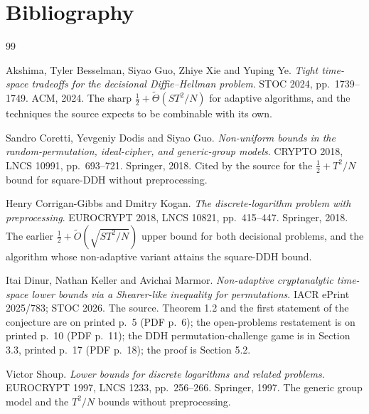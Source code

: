 \documentclass{conjura-conjecture}
\newcommand{\Ot}{\widetilde{O}}
\newcommand{\Th}{\widetilde{\Theta}}
\begin{document}
\section{Bibliography}

\begin{conjurabibliography}{99}

Akshima, Tyler Besselman, Siyao Guo, Zhiye Xie and Yuping Ye.
\emph{Tight time-space tradeoffs for the decisional Diffie--Hellman
problem}.
STOC 2024, pp.\ 1739--1749. ACM, 2024.
The sharp $\tfrac{1}{2} + \Th(ST^{2}/N)$ for adaptive algorithms, and
the techniques the source expects to be combinable with its own.

Sandro Coretti, Yevgeniy Dodis and Siyao Guo.
\emph{Non-uniform bounds in the random-permutation, ideal-cipher, and
generic-group models}.
CRYPTO 2018, LNCS 10991, pp.\ 693--721. Springer, 2018.
Cited by the source for the $\tfrac{1}{2} + T^{2}/N$ bound for
square-DDH without preprocessing.

Henry Corrigan-Gibbs and Dmitry Kogan.
\emph{The discrete-logarithm problem with preprocessing}.
EUROCRYPT 2018, LNCS 10821, pp.\ 415--447. Springer, 2018.
The earlier $\tfrac{1}{2} + \Ot(\sqrt{ST^{2}/N})$ upper bound for both
decisional problems, and the algorithm whose non-adaptive variant
attains the square-DDH bound.

Itai Dinur, Nathan Keller and Avichai Marmor.
\emph{Non-adaptive cryptanalytic time-space lower bounds via a
Shearer-like inequality for permutations}.
IACR ePrint 2025/783; STOC 2026.
The source. Theorem 1.2 and the first statement of the conjecture are
on printed p.\ 5 (PDF p.\ 6); the open-problems restatement is on
printed p.\ 10 (PDF p.\ 11); the DDH permutation-challenge game is in
Section 3.3, printed p.\ 17 (PDF p.\ 18); the proof is Section 5.2.

Victor Shoup.
\emph{Lower bounds for discrete logarithms and related problems}.
EUROCRYPT 1997, LNCS 1233, pp.\ 256--266. Springer, 1997.
The generic group model and the $T^{2}/N$ bounds without
preprocessing.

\end{conjurabibliography}
\end{document}
